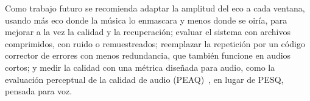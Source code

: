 Como trabajo futuro se recomienda adaptar la amplitud del eco a cada ventana, usando más eco donde la música lo enmascara y menos donde se oiría, para mejorar a la vez la calidad y la recuperación; evaluar el sistema con archivos comprimidos, con ruido o remuestreados; reemplazar la repetición por un código corrector de errores con menos redundancia, que también funcione en audios cortos; y medir la calidad con una métrica diseñada para audio, como la evaluación perceptual de la calidad de audio (PEAQ)~\cite{itu_bs1387}, en lugar de PESQ, pensada para voz.
